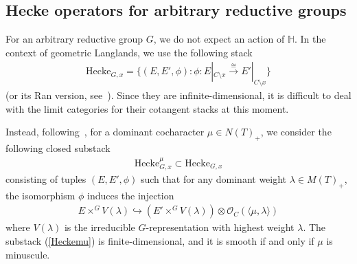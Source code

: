 \documentclass [11pt,oneside,a4paper,mathscr]{amsart}
\newtheorem{cor}[thm]{Corollary}
\theoremstyle{definition}
\newcommand{\Ind}{\operatorname{Ind}}
\newcommand{\IndL}{\operatorname{IndL}}
\newcommand{\GL}{\operatorname{GL}}
\newcommand{\Hig}{\mathrm{Higgs}}
\begin{document}
    
\subsection{Hecke operators for arbitrary reductive groups}\label{subsec:heckeG}
For an arbitrary reductive group $G$, we do not expect an action of $\mathbb{H}$. 
In the context of geometric Langlands, we use the following stack 
\begin{align}\label{Hecke:Gx}
    \mathrm{Hecke}_{G, x}=\{(E, E', \phi): \phi \colon E|_{C\setminus x} \stackrel{\cong}{\to} E'|_{C\setminus x} \}
\end{align}
(or its Ran version, see~\cite[Section~4.4]{Gaitsout}). Since they are infinite-dimensional, 
it is difficult to deal with the limit categories for their cotangent stacks at this moment. 

Instead, following~\cite[Section~2]{DoPa}, for a dominant cocharacter $\mu \in N(T)_{+}$, 
we consider the following closed substack 
\begin{align}\label{Heckemu}
    \mathrm{Hecke}_{G, x}^{\mu} \subset \mathrm{Hecke}_{G, x}
\end{align}
consisting of tuples $(E, E', \phi)$ such that for any dominant weight $\lambda \in M(T)_{+}$, 
the isomorphism $\phi$ induces the injection 
\begin{align*}
    E\times^{G}V(\lambda) \hookrightarrow (E'\times^{G}V(\lambda))\otimes \mathcal{O}_C(\langle \mu, \lambda\rangle)
\end{align*}
where $V(\lambda)$ is the irreducible $G$-representation with highest weight $\lambda$. 
The substack (\ref{Heckemu}) is finite-dimensional, and it is smooth if and only if $\mu$ is minuscule. 
\end{document}
